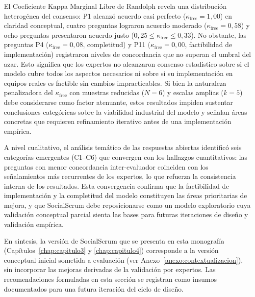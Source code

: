 El Coeficiente Kappa Marginal Libre de Randolph \cite{randolph2005} revela una distribución heterogénea del consenso: P1 alcanzó acuerdo casi perfecto ($\kappa_{\text{free}} = 1{,}00$) en claridad conceptual, cuatro preguntas lograron acuerdo moderado ($\kappa_{\text{free}} = 0{,}58$) y ocho preguntas presentaron acuerdo justo ($0{,}25 \leq \kappa_{\text{free}} \leq 0{,}33$). No obstante, las preguntas P4 ($\kappa_{\text{free}} = 0{,}08$, completitud) y P11 ($\kappa_{\text{free}} = 0{,}00$, factibilidad de implementación) registraron niveles de concordancia que no superan el umbral del azar. Esto significa que los expertos no alcanzaron consenso estadístico sobre si el modelo cubre todos los aspectos necesarios ni sobre si su implementación en equipos reales es factible sin cambios impracticables. Si bien la naturaleza penalizadora del $\kappa_{\text{free}}$ con muestras reducidas ($N = 6$) y escalas amplias ($k = 5$) debe considerarse como factor atenuante, estos resultados impiden sustentar conclusiones categóricas sobre la viabilidad industrial del modelo y señalan áreas concretas que requieren refinamiento iterativo antes de una implementación empírica.

A nivel cualitativo, el análisis temático de las respuestas abiertas identificó seis categorías emergentes (C1--C6) que convergen con los hallazgos cuantitativos: las preguntas con menor concordancia inter-evaluador coinciden con los señalamientos más recurrentes de los expertos, lo que refuerza la consistencia interna de los resultados. Esta convergencia confirma que la factibilidad de implementación y la completitud del modelo constituyen las áreas prioritarias de mejora, y que SocialScrum debe reposicionarse como un modelo exploratorio cuya validación conceptual parcial sienta las bases para futuras iteraciones de diseño y validación empírica.

En síntesis, la versión de SocialScrum que se presenta en esta monografía (Capítulos~\ref{chap:capitulo3} y \ref{chap:capitulo4}) corresponde a la versión conceptual inicial sometida a evaluación (ver Anexo~\ref{anexo:contextualizacion}), sin incorporar las mejoras derivadas de la validación por expertos. Las recomendaciones formuladas en esta sección se registran como insumos documentados para una futura iteración del ciclo de diseño.